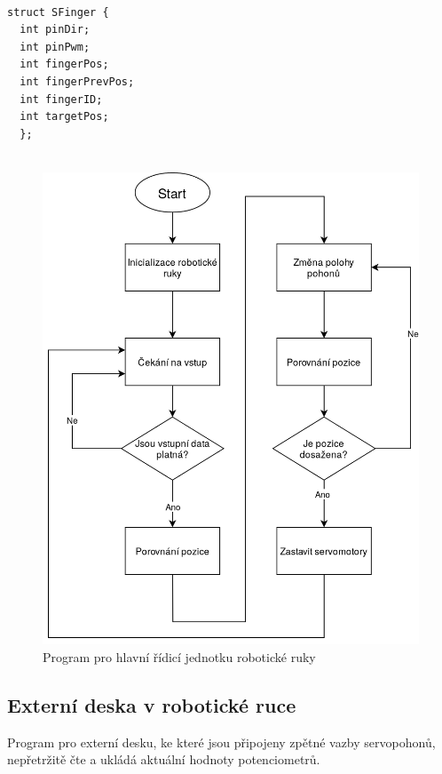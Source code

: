 \documentclass[thesis=B,czech]{FITthesis}[2012/06/26]
\begin{document}
\begin{lstlisting}[caption={Reprezentace motoru},label={code:structTFing}]

struct SFinger {
  int pinDir;
  int pinPwm;
  int fingerPos;
  int fingerPrevPos;   
  int fingerID;
  int targetPos;
  };
  
\end{lstlisting}

 \begin{figure}[H]
\centering
\includegraphics[scale=0.3]{./image/ArdMProgDiagram.png}
\caption{Program pro hlavní řídicí jednotku robotické ruky}
\label{fig:ArdMProgDiagram}
\end{figure} 



\subsection{Externí deska v robotické ruce}

Program pro externí desku, ke které jsou připojeny zpětné vazby servopohonů, nepřetržitě čte a ukládá aktuální hodnoty potenciometrů. 
\end{document}
